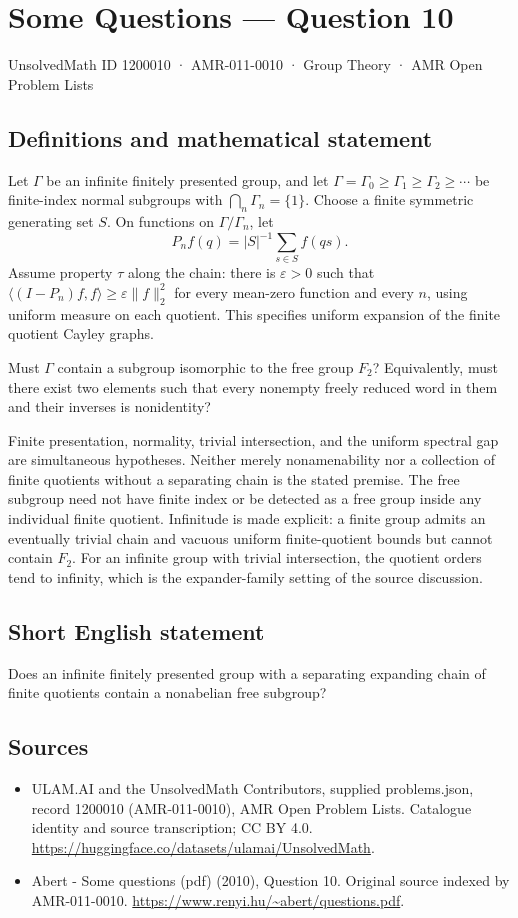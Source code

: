 \documentclass[11pt,a4paper]{article}
\begin{document}
\section*{Some Questions — Question 10}\label{1200010}
{\small UnsolvedMath ID 1200010 · AMR-011-0010 · Group Theory · AMR Open Problem Lists}
\subsection{Definitions and mathematical statement}
Let $\Gamma$ be an infinite finitely presented group, and let
$\Gamma=\Gamma_0\geq\Gamma_1\geq\Gamma_2\geq\cdots$ be finite-index normal subgroups with $\bigcap_n\Gamma_n=\{1\}$. Choose a finite symmetric generating set $S$. On functions on $\Gamma/\Gamma_n$, let
\[
 P_n f(q)=|S|^{-1}\sum_{s\in S}f(qs).
\]
Assume property $\tau$ along the chain: there is $\varepsilon>0$ such that $\langle(I-P_n)f,f\rangle\geq\varepsilon\|f\|_2^2$ for every mean-zero function and every $n$, using uniform measure on each quotient. This specifies uniform expansion of the finite quotient Cayley graphs.

Must $\Gamma$ contain a subgroup isomorphic to the free group $F_2$? Equivalently, must there exist two elements such that every nonempty freely reduced word in them and their inverses is nonidentity?

Finite presentation, normality, trivial intersection, and the uniform spectral gap are simultaneous hypotheses. Neither merely nonamenability nor a collection of finite quotients without a separating chain is the stated premise. The free subgroup need not have finite index or be detected as a free group inside any individual finite quotient. Infinitude is made explicit: a finite group admits an eventually trivial chain and vacuous uniform finite-quotient bounds but cannot contain $F_2$. For an infinite group with trivial intersection, the quotient orders tend to infinity, which is the expander-family setting of the source discussion.
\subsection{Short English statement}
Does an infinite finitely presented group with a separating expanding chain of finite quotients contain a nonabelian free subgroup?
\subsection{Sources}
\begin{itemize}
\item[S1] ULAM.AI and the UnsolvedMath Contributors, supplied problems.json, record 1200010 (AMR-011-0010), AMR Open Problem Lists. Catalogue identity and source transcription; CC BY 4.0.
\url{https://huggingface.co/datasets/ulamai/UnsolvedMath}.
\item[S2] Abert - Some questions (pdf) (2010), Question 10. Original source indexed by AMR-011-0010.
\url{https://www.renyi.hu/~abert/questions.pdf}.
\end{itemize}
\end{document}
